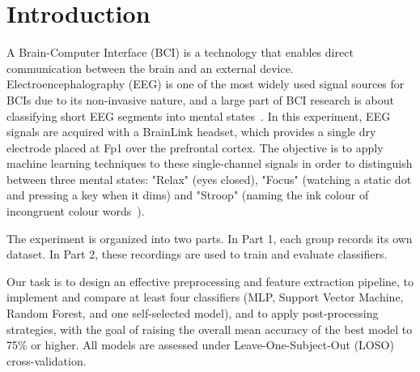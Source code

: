 \section{Introduction}\label{sec:introduction}
A Brain-Computer Interface (BCI) is a technology that enables direct communication between the brain and an external device. Electroencephalography (EEG) is one of the most widely used signal sources for BCIs due to its non-invasive nature, and a large part of BCI research is about classifying short EEG segments into mental states~\cite{lotte2018review}. In this experiment, EEG signals are acquired with a BrainLink headset, which provides a single dry electrode placed at Fp1 over the prefrontal cortex. The objective is to apply machine learning techniques to these single-channel signals in order to distinguish between three mental states: "Relax" (eyes closed), "Focus" (watching a static dot and pressing a key when it dims) and "Stroop" (naming the ink colour of incongruent colour words~\cite{stroop1935}).

\noindent The experiment is organized into two parts. In Part 1, each group records its own dataset. In Part 2, these recordings are used to train and evaluate classifiers.

\noindent Our task is to design an effective preprocessing and feature extraction pipeline, to implement and compare at least four classifiers (MLP, Support Vector Machine, Random Forest, and one self-selected model), and to apply post-processing strategies, with the goal of raising the overall mean accuracy of the best model to 75\% or higher. All models are assessed under Leave-One-Subject-Out (LOSO) cross-validation.
